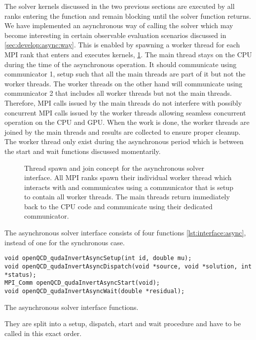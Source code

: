 The solver kernels discussed in the two previous sections are executed by all ranks entering the function and remain blocking until the solver function returns.
We have implemented an asynchronous way of calling the solver which may become interesting in certain observable evaluation scenarios discussed in \cref{sec:develop:async:way}.
This is enabled by spawning a worker thread for each MPI rank that enters \quda and executes kernels, \cref{fig:interface:async}.
The main thread stays on the CPU during the time of the asynchronous operation.
It should communicate using communicator \num{1}, setup such that all the main threads are part of it but not the worker threads.
The worker threads on the other hand will communicate using communicator \num{2} that includes all worker threads but not the main threads.
Therefore, MPI calls issued by the main threads do not interfere with possibly concurrent MPI calls issued by the worker threads allowing seamless concurrent operation on the CPU and GPU.
When the work is done, the worker threads are joined by the main threads and results are collected to ensure proper cleanup.
The worker thread only exist during the asynchronous period which is between the start and wait functions discussed momentarily.
\begin{figure}
  
  \caption{Thread spawn and join concept for the asynchronous solver interface. All MPI ranks spawn their individual worker thread which interacts with \quda and communicates using a communicator that is setup to contain all worker threads. The main threads return immediately back to the CPU code and communicate using their dedicated communicator.}
  \label{fig:interface:async}
\end{figure}

The asynchronous solver interface consists of four functions \cref{lst:interface:async}, instead of one for the synchronous case.
\begin{codelisting}
\begin{verbatim}
void openQCD_qudaInvertAsyncSetup(int id, double mu);
void openQCD_qudaInvertAsyncDispatch(void *source, void *solution, int *status);
MPI_Comm openQCD_qudaInvertAsyncStart(void);
void openQCD_qudaInvertAsyncWait(double *residual);
\end{verbatim}
\caption{The asynchronous solver interface functions.}
\label{lst:interface:async}
\end{codelisting}
They are split into a setup, dispatch, start and wait procedure and have to be called in this exact order.

